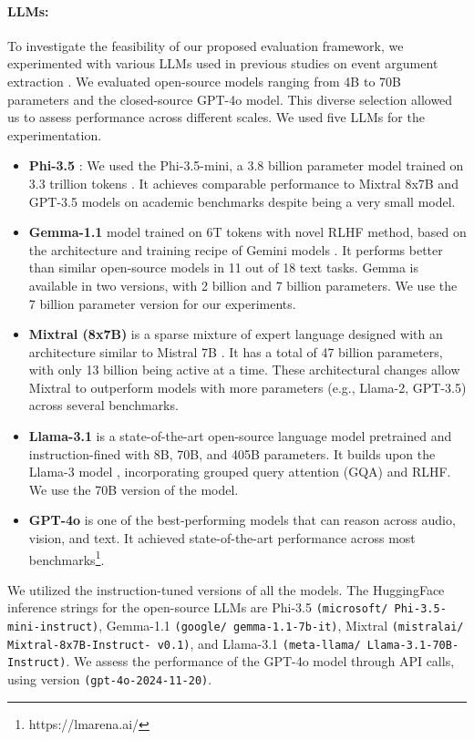 \paragraph{LLMs:} To investigate the feasibility of our proposed evaluation framework, we experimented with various LLMs used in previous studies on event argument extraction \cite{sharif-etal-2024-explicit,lu2024exactmatchsemanticallyreassessing}. We evaluated open-source models ranging from 4B to 70B parameters and the closed-source GPT-4o model. This diverse selection allowed us to assess performance across different scales. We used five LLMs for the experimentation.
\begin{itemize}
    \item \textbf{Phi-3.5} : 
    We used the Phi-3.5-mini, a 3.8 billion parameter model trained on 3.3 trillion tokens \cite{phi-3.5}. It achieves comparable performance to Mixtral  8x7B and GPT-3.5 models on academic benchmarks despite being a very small model. 
    
    \item \textbf{Gemma-1.1} model trained on 6T tokens with novel RLHF method, based on the architecture and training recipe of Gemini models \cite{gemmateam2024gemma}. It performs better than similar open-source models in 11 out of 18 text tasks. Gemma is available in two versions, with 2 billion and 7 billion parameters. We use the 7 billion parameter version for our experiments.
    
    \item \textbf{Mixtral (8x7B)} is a sparse mixture of expert language designed with an architecture similar to Mistral 7B \cite{jiang2024mixtral}. It has a total of 47 billion parameters, with only 13 billion being active at a time. These architectural changes allow Mixtral to outperform models with more parameters (e.g., Llama-2, GPT-3.5) across several benchmarks. 
    
    \item \textbf{Llama-3.1} is a state-of-the-art open-source language model pretrained and instruction-fined with 8B, 70B, and 405B parameters. It builds upon the Llama-3 model \cite{llama-3.1}, incorporating grouped query attention (GQA) and RLHF. We use the 70B version of the model. 

 
    \item \textbf{GPT-4o} \cite{openai2024gpt4} is one of the best-performing models that can reason across audio, vision, and text. It achieved state-of-the-art performance across most benchmarks\footnote{https://lmarena.ai/}. 
\end{itemize}

We utilized the instruction-tuned versions of all the models. The HuggingFace inference strings for the open-source LLMs are Phi-3.5 \texttt{(microsoft/ Phi-3.5-mini-instruct)}, Gemma-1.1 \texttt{(google/ gemma-1.1-7b-it)}, Mixtral \texttt{(mistralai/ Mixtral-8x7B-Instruct- v0.1)}, and Llama-3.1 \texttt{(meta-llama/ Llama-3.1-70B-Instruct)}. We assess the performance of the GPT-4o model through API calls, using version \texttt{(gpt-4o-2024-11-20)}.